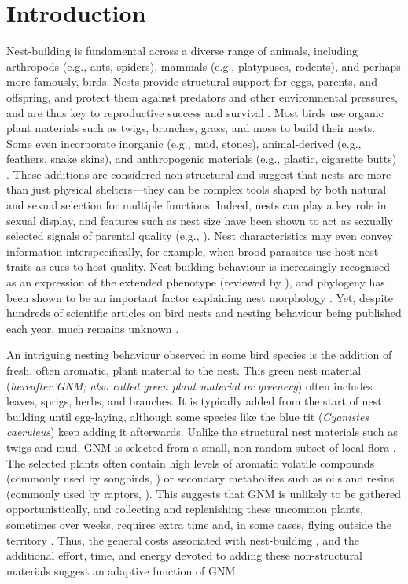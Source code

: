 \documentclass[
  number,
  review,
  onecolumn]{elsarticle}
\begin{document}
\linenumbers


\section{Introduction}\label{introduction}

Nest-building is fundamental across a diverse range of animals,
including arthropods (e.g., ants, spiders), mammals (e.g., platypuses,
rodents), and perhaps more famously, birds. Nests provide structural
support for eggs, parents, and offspring, and protect them against
predators and other environmental pressures, and are thus key to
reproductive success and survival
\citep{hansell2000, mainwaring2014, deeming2023}. Most birds use organic
plant materials such as twigs, branches, grass, and moss to build their
nests. Some even incorporate inorganic (e.g., mud, stones),
animal-derived (e.g., feathers, snake skins), and anthropogenic
materials (e.g., plastic, cigarette butts)
\citep{sergio2011, suárez-rodríguez2013, jagiello2023, sheard2024}.
These additions are considered non-structural and suggest that nests are
more than just physical shelters---they can be complex tools shaped by
both natural and sexual selection for multiple functions. Indeed, nests
can play a key role in sexual display, and features such as nest size
have been shown to act as sexually selected signals of parental quality
(e.g., \citep{moreno1994, hoi1996}). Nest characteristics may even
convey information interspecifically, for example, when brood parasites
use host nest traits as cues to host quality\citep{soler1995}.
Nest-building behaviour is increasingly recognised as an expression of
the extended phenotype (reviewed by \citep{moreno2012}), and phylogeny
has been shown to be an important factor explaining nest morphology
\citep{perez2023}. Yet, despite hundreds of scientific articles on bird
nests and nesting behaviour being published each year, much remains
unknown \citep{jezierski2025}.

An intriguing nesting behaviour observed in some bird species is the
addition of fresh, often aromatic, plant material to the nest. This
green nest material (\emph{hereafter GNM; also called green plant
material or greenery}) often includes leaves, sprigs, herbs, and
branches. It is typically added from the start of nest building until
egg-laying, although some species like the blue tit (\emph{Cyanistes
caeruleus}) keep adding it afterwards. Unlike the structural nest
materials such as twigs and mud, GNM is selected from a small,
non-random subset of local flora
\citep{clark1985, petit2002, garrido-bautista2023}. The selected plants
often contain high levels of aromatic volatile compounds (commonly used
by songbirds, \citep{mennerat2009b}) or secondary metabolites such as
oils and resins (commonly used by raptors, \citep{ontiveros2008}). This
suggests that GNM is unlikely to be gathered opportunistically, and
collecting and replenishing these uncommon plants, sometimes over weeks,
requires extra time and, in some cases, flying outside the territory
\citep{mennerat2009}. Thus, the general costs associated with
nest-building \citep{mainwaring2013}, and the additional effort, time,
and energy devoted to adding these non-structural materials suggest an
adaptive function of GNM.
\end{document}
